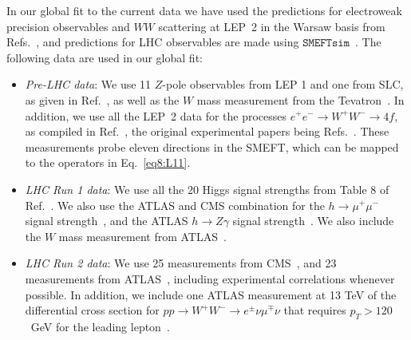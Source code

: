 \documentclass[../report.tex]{subfiles}
\begin{document}
In our global fit to the current data we have used the predictions for electroweak precision observables and $WW$ scattering at LEP~2 in the 
Warsaw basis from Refs.~\cite{Berthier:2016tkq, Brivio:2017vri}, and predictions for LHC observables are made using $\mathtt{SMEFTsim}$~\cite{Brivio:2017btx}.
The following data are used in our global fit:

\begin{itemize}
\item \textit{Pre-LHC data}:  
We use 11 $Z$-pole observables from LEP 1 and one from SLC, as given in Ref.~\cite{ALEPH:2005ab}, as well as the $W$ mass measurement from the 
Tevatron~\cite{Aaltonen:2013iut}.
In addition, we use all the LEP~2 data for the processes $e^+ e^- \to W^+ W^- \to 4f$,
as compiled in Ref.~\cite{Berthier:2016tkq}, the original experimental papers being Refs.~\cite{Heister:2004wr, Achard:2004zw, Abbiendi:2007rs, Schael:2013ita}. 
These measurements probe eleven directions in the SMEFT, which can be mapped to the operators in Eq.~\eqref{eq8:L11}.

\item \textit{LHC Run 1 data}: 
We use all the 20 Higgs signal strengths from Table 8 of Ref.~\cite{Khachatryan:2016vau}.
We also use the ATLAS and CMS combination for the $h \to \mu^+ \mu^-$ signal strength~\cite{Khachatryan:2016vau}, and the ATLAS $h \to Z \gamma$ signal strength~\cite{Aad:2015gba}. 
We also include the $W$ mass measurement from ATLAS~\cite{Aaboud:2017svj}.

\item \textit{LHC Run 2 data}: 
We use 25 measurements from CMS~\cite{Sirunyan:2017dgc, Sirunyan:2017elk, Sirunyan:2018mvw, Sirunyan:2018shy, CMS-PAS-HIG-16-042, Sirunyan:2018ouh, Sirunyan:2017exp, Sirunyan:2017khh}, and 23 measurements from ATLAS~\cite{Aaboud:2017ojs, Aaboud:2017xsd, Aaboud:2017rss, Aaboud:2017jvq, ATLAS-CONF-2018-004, ATLAS-CONF-2017-047, ATLAS-CONF-2016-112}, including experimental correlations whenever possible. 
In addition, we include one ATLAS measurement at 13 TeV of the differential cross section for $p p \to W^+ W^- \to e^{\pm} \nu \mu^{\mp} \nu$
that requires $p_T > 120$~GeV for the leading lepton~\cite{Aaboud:2017qkn}.
\end{itemize}
\end{document}
